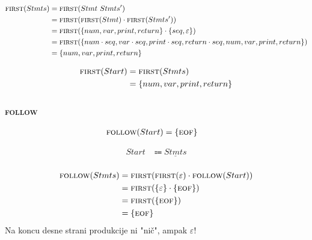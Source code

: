\documentclass{report}
\newcommand{\Null}{\varepsilon}
\newcommand{\Seq}{\cdot}
\newcommand{\Spc}{\ }
\newcommand{\FIRST}{\textsc{first}}
\newcommand{\FOLLOW}{\textsc{follow}}
\newcommand{\EOF}{\textsc{eof}}
\newcommand{\Arrow}{\Coloneq}
\newcommand{\NT}[1]{{#1}}
\newcommand{\T}[1]{{#1}}
\begin{document}
\begin{equation*}
  \begin{aligned}
    \FIRST(\NT{Stmts}) &= \FIRST(\NT{Stmt} \Spc \NT{Stmts'})\\
    &= \FIRST(\FIRST(\NT{Stmt}) \Seq \FIRST(\NT{Stmts'}))\\
    &= \FIRST(\{\T{num}, \T{var}, \T{print}, \T{return}\} \Seq \{\T{seq},\Null\})\\
    &= \FIRST(\{\T{num} \Seq \T{seq}, \T{var} \Seq \T{seq}, \T{print} \Seq \T{seq}, \T{return} \Seq \T{seq}, \T{num}, \T{var}, \T{print}, \T{return}\})\\
    &= \{\T{num}, \T{var}, \T{print}, \T{return}\}\\
  \end{aligned}
\end{equation*}

\begin{equation*}
  \begin{aligned}
    \FIRST(\NT{Start}) &= \FIRST(\NT{Stmts})\\
    &= \{\T{num}, \T{var}, \T{print}, \T{return}\}
  \end{aligned}
\end{equation*}

\subsubsection*{{\FOLLOW}}
\begin{equation*}
  \begin{aligned}
    \FOLLOW(\NT{Start}) &= \{\EOF\}
  \end{aligned}
\end{equation*}

\begin{equation*}
  \begin{aligned}
    \NT{Start} &\Arrow \underline{\NT{Stmts}}\\
  \end{aligned}
\end{equation*}

\begin{equation*}
  \begin{aligned}
    \FOLLOW(\NT{Stmts}) &= \FIRST(\FIRST(\Null) \Seq \FOLLOW(\NT{Start}))\\
    &= \FIRST(\{\Null\} \Seq \{\EOF\})\\
    &= \FIRST(\{\EOF\})\\
    &= \{\EOF\}
  \end{aligned}
\end{equation*}
Na koncu desne strani produkcije ni "nič", ampak $\Null$!
\end{document}
